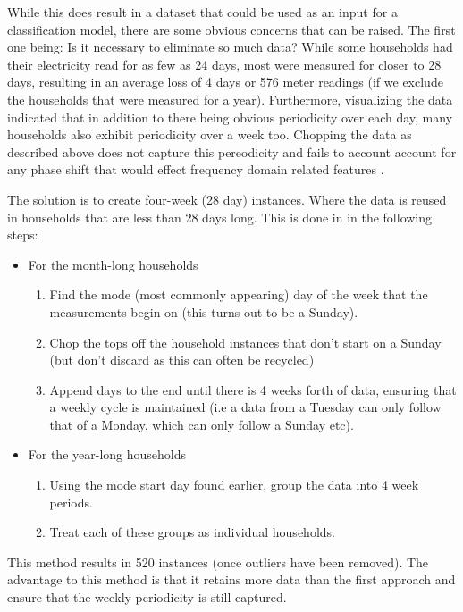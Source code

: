\documentclass[12pt,a4paper]{article}
\begin{document}
While this does result in a dataset that could be used as an input for a classification model, there are some obvious concerns that can be raised. The first one being: Is it necessary to eliminate so much data? While some households had their electricity read for as few as 24 days, most were measured for closer to 28 days, resulting in an average loss of 4 days or 576 meter readings (if we exclude the households that were measured for a year). Furthermore, visualizing the data indicated that in addition to there being obvious periodicity over each day, many households also exhibit periodicity over a week too. Chopping the data as described above does not capture this pereodicity and fails to account account for any phase shift that would effect frequency domain related features \cite{Smith}.

The solution is to create four-week (28 day) instances. Where the data is reused in households that are less than 28 days long. This is done in in the following steps:

\begin{itemize}
	\item For the month-long households
	\begin{enumerate}
		\item Find the mode (most commonly appearing) day of the week that the measurements begin on (this turns out to be a Sunday).
		\item Chop the tops off the household instances that don't start on a Sunday (but don't discard as this can often be recycled)
		\item Append days to the end until there is 4 weeks forth of data, ensuring that a weekly cycle is maintained (i.e a data from a Tuesday can only follow that of a Monday, which can only follow a Sunday etc).
	\end{enumerate}
	\item For the year-long households
	\begin{enumerate}
		\item Using the mode start day found earlier, group the data into 4 week periods.
		\item Treat each of these groups as individual households.
	\end{enumerate}
\end{itemize}

This method results in 520 instances (once outliers have been removed). The advantage to this method is that it retains more data than the first approach and ensure that the weekly periodicity is still captured.
\end{document}
